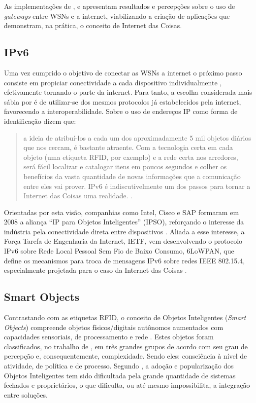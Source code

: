 \documentclass[twoside,english,brazilian]{UNISINOSmonografia}
\begin{document}
	As implementações de ,  e 
	 apresentam resultados e percepções sobre o uso de 
	\textit{gateways} entre WSNs e a internet, viabilizando a criação de 
	aplicações que demonstram, na prática, o conceito de Internet das Coisas.

\subsection{IPv6}
	Uma vez cumprido o objetivo de conectar as WSNs a internet o próximo passo 
	consiste em propiciar conectividade a cada dispositivo individualmente 
	\cite[p.~13]{Atzori2010b}, efetivamente tornando-o parte da internet.
	Para tanto, a escolha considerada mais sábia por  
	é de utilizar-se dos mesmos protocolos já estabelecidos pela internet, 
	favorecendo a interoperabilidade.
	Sobre o uso de endereços IP como forma de 
	identificação  dizem que:
	\begin{quote}
		a ideia de atribuí-los a cada um dos aproximadamente 5 
		mil objetos diários que nos cercam, é bastante atraente.
		Com a tecnologia certa em cada objeto (uma etiqueta RFID, por exemplo) 
		e a rede certa nos arredores, será fácil localizar e catalogar itens 
		em poucos segundos e colher os benefícios da vasta quantidade de novas 
		informações que a comunicação entre eles vai prover. IPv6 é 
		indiscutivelmente um dos passos para tornar a Internet das Coisas uma 
		realidade.
		\cite[p.~15]{Sundmaeker2010}.
	\end{quote}
	
	Orientadas por esta visão, companhias como Intel, Cisco e SAP formaram em 
	2008 a aliança ``IP para Objetos Inteligentes'' (IPSO), reforçando o 
	interesse da indústria pela conectividade direta entre dispositivos 
	\cite{Dunkels2008, Mattern2010a}. 
	Aliada a esse interesse, a Força Tarefa de Engenharia da Internet, IETF, 
	vem desenvolvendo o protocolo IPv6 sobre Rede Local Pessoal Sem Fio de 
	Baixo Consumo, 6LoWPAN, que define os mecanismos para troca de mensagens 
	IPv6 sobre redes IEEE 802.15.4, especialmente projetada para o caso da 
	Internet das Coisas \cite{Gomez2010}.

\subsection{Smart Objects}
	Contrastando com as etiquetas RFID, o conceito de Objetos Inteligentes 
	(\textit{Smart Objects}) compreende objetos físicos/digitais autônomos 
	aumentados com capacidades sensoriais, de processamento e rede 
	\cite{Gellersen2001}.
	Estes objetos foram classificados, no trabalho de , em 
	três grandes grupos de acordo com seu grau de percepção e, 
	consequentemente, complexidade. Sendo eles: consciência à nível de 
	atividade, de política e de processo.
	Segundo , a adoção e popularização dos Objetos 
	Inteligentes tem sido dificultada pela grande quantidade de sistemas 
	fechados e proprietários, o que dificulta, ou até mesmo impossibilita, a 
	integração entre soluções. 
	
\end{document}
